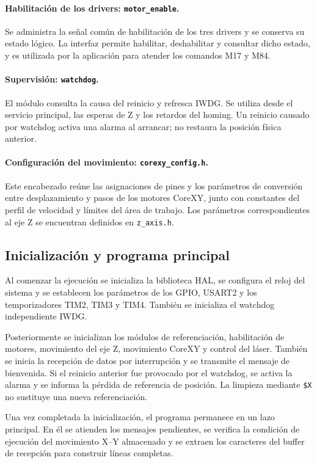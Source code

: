 \documentclass[blue,fullpaper]{ludusofficial}  %
\begin{document}
\paragraph{Habilitación de los drivers:
\texttt{motor\_enable}.}
Se administra la señal común de habilitación de los
tres drivers y se conserva su estado lógico. La interfaz
permite habilitar, deshabilitar y consultar dicho estado,
y es utilizada por la aplicación para atender los
comandos M17 y M84.

\paragraph{Supervisión: \texttt{watchdog}.}
El módulo consulta la causa del reinicio y refresca IWDG. Se utiliza desde el servicio principal, las esperas de Z y los retardos del homing. Un reinicio causado por watchdog activa una alarma al arrancar; no restaura la posición física anterior.

\paragraph{Configuración del movimiento:
\texttt{corexy\_config.h}.}
Este encabezado reúne las asignaciones de pines y
los parámetros de conversión entre desplazamiento
y pasos de los motores CoreXY, junto con constantes
del perfil de velocidad y límites del área de trabajo.
Los parámetros correspondientes al eje Z se encuentran
definidos en \texttt{z\_axis.h}.

\subsection{Inicialización y programa principal}

Al comenzar la ejecución se inicializa
la biblioteca HAL, se configura el reloj
del sistema y se establecen los parámetros
de los GPIO, USART2 y los temporizadores
TIM2, TIM3 y TIM4. También se inicializa el watchdog independiente IWDG.

Posteriormente se inicializan los módulos
de referenciación, habilitación de motores,
movimiento del eje Z, movimiento CoreXY
y control del láser. También se inicia
la recepción de datos por interrupción
y se transmite el mensaje de bienvenida. Si el reinicio anterior fue provocado por el watchdog, se activa la alarma y se informa la pérdida de referencia de posición. La limpieza mediante \texttt{\$X} no sustituye una nueva referenciación.

Una vez completada la inicialización,
el programa permanece en un lazo principal.
En él se atienden los mensajes pendientes,
se verifica la condición de ejecución
del movimiento X--Y almacenado y se extraen
los caracteres del buffer de recepción
para construir líneas completas.
\end{document}

